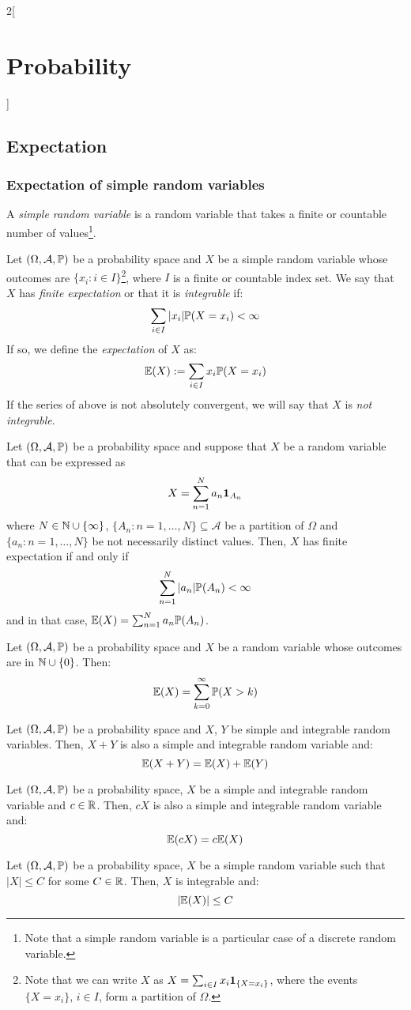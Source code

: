 \documentclass[../../../main.tex]{subfiles}
\begin{document}
\begin{multicols}{2}[\section{Probability}]
  \subsection{Expectation}
  \subsubsection{Expectation of simple random variables}
  \begin{definition}
    A \textit{simple random variable} is a random variable that takes a finite or countable number of values\footnote{Note that a simple random variable is a particular case of a discrete random variable.}.
  \end{definition}
  \begin{definition}
    Let $(\Omega,\mathcal{A},\mathbb{P})$ be a probability space and $X$ be a simple random variable whose outcomes are $\{x_i:i\in I\}$\footnote{Note that we can write $X$ as $X=\sum_{i\in I}x_i\boldsymbol{\mathrm{1}}_{\{X=x_i\}}$, where the events $\{X=x_i\}$, $i\in I$, form a partition of $\Omega$.}, where $I$ is a finite or countable index set. We say that $X$ has \textit{finite expectation} or that it is \textit{integrable} if: $$\sum_{i\in I}|x_i|\mathbb{P}(X=x_i)<\infty$$
    If so, we define the \textit{expectation} of $X$ as: $$\mathbb{E}(X):=\sum_{i\in I}x_i\mathbb{P}(X=x_i)$$ If the series of above is not absolutely convergent, we will say that $X$ is \textit{not integrable}.
  \end{definition}
  \begin{lemma}
    Let $(\Omega,\mathcal{A},\mathbb{P})$ be a probability space and suppose that $X$ be a random variable that can be expressed as $$X=\sum_{n=1}^Na_n\boldsymbol{\mathrm{1}}_{A_n}$$ where $N\in\mathbb{N}\cup\{\infty\}$, $\{A_n:n=1,\ldots,N\}\subseteq\mathcal{A}$ be a partition of $\Omega$ and $\{a_n:n=1,\ldots,N\}$ be not necessarily distinct values. Then, $X$ has finite expectation if and only if $$\sum_{n=1}^N|a_n|\mathbb{P}(A_n)<\infty$$ and in that case, $\mathbb{E}(X)=\sum_{n=1}^Na_n\mathbb{P}(A_n)$.
  \end{lemma}
  \begin{prop}
    Let $(\Omega,\mathcal{A},\mathbb{P})$ be a probability space and $X$ be a random variable whose outcomes are in $\mathbb{N}\cup\{0\}$. Then: $$\mathbb{E}(X)=\sum_{k=0}^\infty\mathbb{P}(X>k)$$
  \end{prop}
  \begin{prop}
    Let $(\Omega,\mathcal{A},\mathbb{P})$ be a probability space and $X$, $Y$ be simple and integrable random variables. Then, $X+Y$ is also a simple and integrable random variable and: $$\mathbb{E}(X+Y)=\mathbb{E}(X)+\mathbb{E}(Y)$$
  \end{prop}
  \begin{prop}
    Let $(\Omega,\mathcal{A},\mathbb{P})$ be a probability space, $X$ be a simple and integrable random variable and $c\in\mathbb{R}$. Then, $cX$ is also a simple and integrable random variable and: $$\mathbb{E}(cX)=c\mathbb{E}(X)$$
  \end{prop}
  \begin{prop}
    Let $(\Omega,\mathcal{A},\mathbb{P})$ be a probability space, $X$ be a simple random variable such that $|X|\leq C$ for some $C\in\mathbb{R}$. Then, $X$ is integrable and: $$|\mathbb{E}(X)|\leq C$$
  \end{prop}

\end{multicols}
\end{document}
